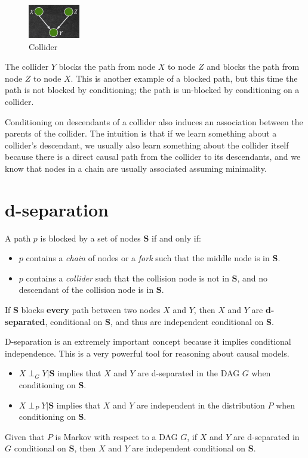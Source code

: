 \begin{figure}[!ht]
    \centering
    \includegraphics[width=0.2\textwidth]{img/flow/collider.png}
    \caption{Collider}
    \label{fig:collider}
\end{figure}

The collider $Y$ blocks the path from node $X$ to node $Z$ and blocks the path
from node $Z$ to node $X$. This is another example of a blocked path, but this
time the path is not blocked by conditioning; the path is un-blocked by conditioning
on a collider.

Conditioning on descendants of a collider also induces an association between the
parents of the collider. The intuition is that if we learn something about a
collider's descendant, we usually also learn something about the collider itself
because there is a direct causal path from the collider to its descendants, and
we know that nodes in a chain are usually associated assuming minimality.
\section{d-separation}
\begin{definition}
    A path $p$ is blocked by a set of nodes $\mathbf{S}$ if and only if:
    \begin{itemize}
        \item $p$ contains a \textit{chain} of nodes or a \textit{fork} such that
              the middle node is in $\mathbf{S}$.
        \item $p$ contains a \textit{collider} such that the collision node is
              not in $\mathbf{S}$, and no descendant of the collision node is in
              $\mathbf{S}$.
    \end{itemize}
    If $\mathbf{S}$ blocks \textbf{every} path between two nodes $X$ and $Y$, then
    $X$ and $Y$ are \textbf{d-separated}, conditional on $\mathbf{S}$, and thus
    are independent conditional on $\mathbf{S}$.
\end{definition}
D-separation is an extremely important concept because it implies conditional
independence. This is a very powerful tool for reasoning about causal models.
\begin{itemize}
    \item $X \perp_G Y | \mathbf{S}$ implies that $X$ and $Y$ are d-separated in the DAG
          $G$ when conditioning on $\mathbf{S}$.
    \item $X \perp_P Y | \mathbf{S}$ implies that $X$ and $Y$ are independent in the
          distribution $P$ when conditioning on $\mathbf{S}$.
\end{itemize}
\begin{definition}
    Given that $P$ is Markov with respect to a DAG $G$, if $X$ and $Y$ are d-separated
    in $G$ conditional on $\mathbf{S}$, then $X$ and $Y$ are independent conditional
    on $\mathbf{S}$.
\end{definition}

